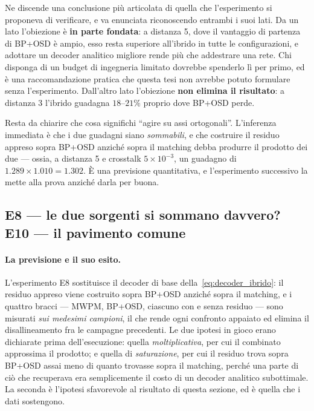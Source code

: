 Ne discende una conclusione più articolata di quella che l'esperimento si proponeva di verificare, e va enunciata riconoscendo entrambi i suoi lati. Da un lato l'obiezione è \textbf{in parte fondata}: a distanza 5, dove il vantaggio di partenza di BP+OSD è ampio, esso resta superiore all'ibrido in tutte le configurazioni, e adottare un decoder analitico migliore rende più che addestrare una rete. Chi disponga di un budget di ingegneria limitato dovrebbe spenderlo lì per primo, ed è una raccomandazione pratica che questa tesi non avrebbe potuto formulare senza l'esperimento. Dall'altro lato l'obiezione \textbf{non elimina il risultato}: a distanza 3 l'ibrido guadagna $18$--$21\%$ proprio dove BP+OSD perde.

Resta da chiarire che cosa significhi ``agire su assi ortogonali''. L'inferenza immediata è che i due guadagni siano \emph{sommabili}, e che costruire il residuo appreso sopra BP+OSD anziché sopra il matching debba produrre il prodotto dei due --- ossia, a distanza 5 e crosstalk $5\times10^{-3}$, un guadagno di $1.289 \times 1.010 = 1.302$. È una previsione quantitativa, e l'esperimento successivo la mette alla prova anziché darla per buona.

\subsection{E8 --- le due sorgenti si sommano davvero? E10 --- il pavimento comune}
\label{subsec:neural_pavimento}

\paragraph{La previsione e il suo esito.}
L'esperimento E8 sostituisce il decoder di base della~\eqref{eq:decoder_ibrido}: il residuo appreso viene costruito sopra BP+OSD anziché sopra il matching, e i quattro bracci --- \ac{MWPM}, BP+OSD, ciascuno con e senza residuo --- sono misurati \emph{sui medesimi campioni}, il che rende ogni confronto appaiato ed elimina il disallineamento fra le campagne precedenti. Le due ipotesi in gioco erano dichiarate prima dell'esecuzione: quella \emph{moltiplicativa}, per cui il combinato approssima il prodotto; e quella di \emph{saturazione}, per cui il residuo trova sopra BP+OSD assai meno di quanto trovasse sopra il matching, perché una parte di ciò che recuperava era semplicemente il costo di un decoder analitico subottimale. La seconda è l'ipotesi sfavorevole al risultato di questa sezione, ed è quella che i dati sostengono.


